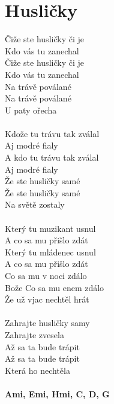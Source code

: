 \section{Husličky}
Čiže ste husličky či je \\
Kdo vás tu zanechal \\
Čiže ste husličky či je \\
Kdo vás tu zanechal \\
Na trávě poválané \\
Na trávě poválané \\
U paty ořecha \\
\\
Kdože tu trávu tak zválal \\
Aj modré fialy \\
A kdo tu trávu tak zválal \\
Aj modré fialy \\
Že ste husličky samé \\
Že ste husličky samé \\
Na světě zostaly \\
\\
Který tu muzikant usnul \\
A co sa mu přišlo zdát \\
Který tu mládenec usnul \\
A co sa mu přišlo zdát \\
Co sa mu v noci zdálo \\
Bože Co sa mu enem zdálo \\
Že už vjac nechtěl hrát \\
\\
Zahrajte husličky samy \\
Zahrajte zvesela \\
Až sa ta bude trápit \\
Až sa ta bude trápit \\
Která ho nechtěla\\
\\
\footnotesize\textbf{Ami, Emi, Hmi, C, D, G}\\
\normalsize